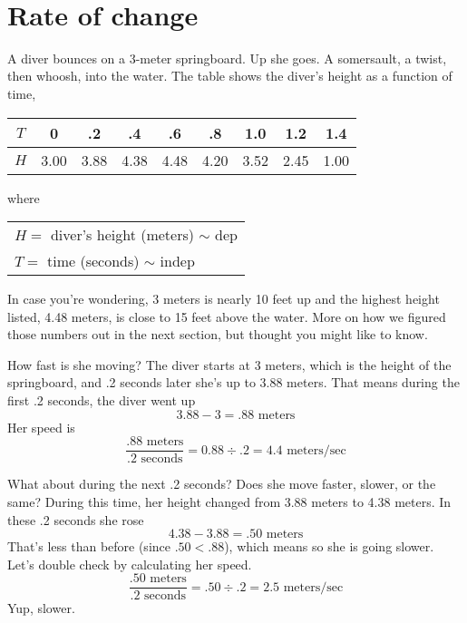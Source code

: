  ~\vspace{.1in}
 
\section{Rate of change}

A diver bounces on a 3-meter springboard. Up she goes.  A somersault, a twist, then whoosh, into the water.  
The table shows the diver's height as a function of time, 

\begin{center}
\begin{tabular} {|c| | c|c|c|  c|c|c| c|c|} \hline
$T$ & 0 & .2 & .4 & .6 & .8 & 1.0 & 1.2 & 1.4 \\ \hline
$H$ & 3.00 & 3.88 & 4.38 & 4.48 & 4.20  & 3.52 & 2.45 & 1.00 \\ \hline
\end{tabular}
\end{center}
where \begin{center}
\begin{tabular} {l}
$H=$ diver's height (meters) $\sim$ dep \\
$T= $ time (seconds) $\sim$ indep \\ 
\end{tabular}
\end{center}

In case you're wondering, 3 meters is nearly 10 feet up and the highest height listed, 4.48 meters, is close to 15 feet above the water.  More on how we figured those numbers out in the next section, but thought you might like to know.  

How fast is she moving?  The diver starts at 3 meters, which is the height of the springboard, and .2 seconds later she's up to 3.88 meters.  That means during the first .2 seconds, the diver went up $$3.88-3 = .88 \text{ meters}$$
Her speed is  $$\frac{.88 \text{ meters}}{.2 \text{ seconds}} = 0.88 \div .2 = 4.4 \text{ meters/sec}$$

What about during the next .2 seconds?  Does she move faster, slower, or the same?  During this time, her height changed from 3.88 meters to 4.38 meters.  In these .2 seconds she rose $$4.38-3.88 = .50 \text{ meters}$$
That's less than before (since $.50 < .88$), which means so she is going slower.  Let's double check by calculating her speed.
$$\frac{.50 \text{ meters}}{.2 \text{ seconds}} = .50 \div .2 = 2.5 \text{ meters/sec}$$
Yup, slower.

